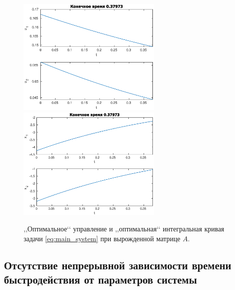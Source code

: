 \begin{figure}[h]
                \hfill
                \includegraphics[width=70mm]{program/v-control.eps}
                \hfill
                \hfill
                \includegraphics[width=70mm]{program/v-traectory.eps}
                \hfill
                \caption{,,Оптимальное‘‘ управление и ,,оптимальная‘‘ интегральная кривая задачи \eqref{eq:main_system} при вырожденной матрице $A$.}
\end{figure}


\subsection{Отсутствие непрерывной зависимости времени быстродействия от параметров системы}


